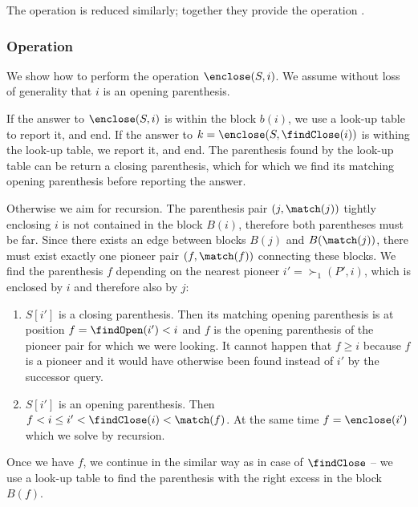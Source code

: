 The operation \findOpen{} is reduced similarly; together they provide the operation \match{}.

\subsubsection{Operation \enclose}

We show how to perform the operation $\enclose(S, i)$.
We assume without loss of generality that $i$ is an opening parenthesis.

If the answer to $\enclose(S, i)$ is within the block $b(i)$, we use a look-up table to report it, and end.
If the answer to $k = \enclose(S, \findClose(i))$ is withing the look-up table, we report it, and end.
The parenthesis found by the look-up table can be return a closing parenthesis, which for which we find its matching opening parenthesis before reporting the answer.

Otherwise we aim for recursion.
The parenthesis pair $(j, \match(j))$ tightly enclosing $i$ is not contained in the block $B(i)$, therefore both parentheses must be far.
Since there exists an edge between blocks $B(j)$ and $B(\match(j))$, there must exist exactly one pioneer pair $(f, \match(f))$ connecting these blocks.
We find the parenthesis $f$ depending on the nearest pioneer $i' = \succ_1(P', i)$, which is enclosed by $i$ and therefore also by $j$:
\begin{enumerate}
	\item $S[i']$ is a closing parenthesis.
	Then its matching opening parenthesis is at position $f = \findOpen(i') < i$ and $f$ is the opening parenthesis of the pioneer pair for which we were looking.
	It cannot happen that $f \ge i$ because $f$ is a pioneer and it would have otherwise been found instead of $i'$ by the successor query.
	\item $S[i']$ is an opening parenthesis.
	Then $f < i \le i' < \findClose(i) < \match(f)$.
	At the same time $f = \enclose(i')$ which we solve by recursion.
\end{enumerate}
Once we have $f$, we continue in the similar way as in case of $\findClose$ -- we use a look-up table to find the parenthesis with the right excess in the block $B(f)$.

